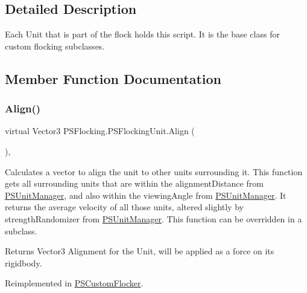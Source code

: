 \subsection{Detailed Description}
Each Unit that is part of the flock holds this script. It is the base class for custom flocking subclasses. 

\subsection{Member Function Documentation}
\mbox{\label{class_p_s_flocking_1_1_p_s_flocking_unit_ada3fa9e23f12a1b8258dc324f5b3e511}} 
\subsubsection{\texorpdfstring{Align()}{Align()}}
{\footnotesize\ttfamily virtual Vector3 P\+S\+Flocking.\+P\+S\+Flocking\+Unit.\+Align (\begin{DoxyParamCaption}{ }\end{DoxyParamCaption})\hspace{0.3cm}{\ttfamily [protected]}, {\ttfamily [virtual]}}



Calculates a vector to align the unit to other units surrounding it. This function gets all surrounding units that are within the alignment\+Distance from \hyperlink{class_p_s_flocking_1_1_p_s_unit_manager}{P\+S\+Unit\+Manager}, and also within the viewing\+Angle from \hyperlink{class_p_s_flocking_1_1_p_s_unit_manager}{P\+S\+Unit\+Manager}. It returns the average velocity of all those units, altered slightly by strength\+Randomizer from \hyperlink{class_p_s_flocking_1_1_p_s_unit_manager}{P\+S\+Unit\+Manager}. This function can be overridden in a subclass. 

\begin{DoxyReturn}{Returns}
Vector3 Alignment for the Unit, will be applied as a force on its rigidbody. 
\end{DoxyReturn}


Reimplemented in \hyperlink{class_p_s_custom_flocker_a50d8ac4146196420bcf1181289a27e40}{P\+S\+Custom\+Flocker}.

\mbox{\label{class_p_s_flocking_1_1_p_s_flocking_unit_a87ad210603e8d8451e14a4de8af9cba0}} 
